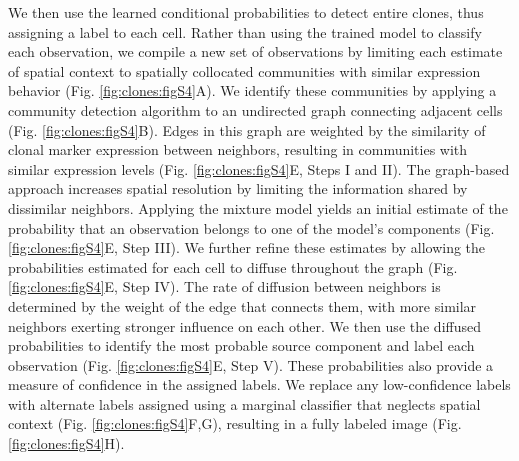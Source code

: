 We then use the learned conditional probabilities to detect entire clones, thus assigning a label to each cell. Rather than using the trained model to classify each observation, we compile a new set of observations by limiting each estimate of spatial context to spatially collocated communities with similar expression behavior (Fig. \ref{fig:clones:figS4}A). We identify these communities by applying a community detection algorithm to an undirected graph connecting adjacent cells (Fig. \ref{fig:clones:figS4}B). Edges in this graph are weighted by the similarity of clonal marker expression between neighbors, resulting in communities with similar expression levels (Fig. \ref{fig:clones:figS4}E, Steps I and II). The graph-based approach increases spatial resolution by limiting the information shared by dissimilar neighbors. Applying the mixture model yields an initial estimate of the probability that an observation belongs to one of the model's components (Fig. \ref{fig:clones:figS4}E, Step III). We further refine these estimates by allowing the probabilities estimated for each cell to diffuse throughout the graph (Fig. \ref{fig:clones:figS4}E, Step IV). The rate of diffusion between neighbors is determined by the weight of the edge that connects them, with more similar neighbors exerting stronger influence on each other. We then use the diffused probabilities to identify the most probable source component and label each observation (Fig. \ref{fig:clones:figS4}E, Step V). These probabilities also provide a measure of confidence in the assigned labels. We replace any low-confidence labels with alternate labels assigned using a marginal classifier that neglects spatial context (Fig. \ref{fig:clones:figS4}F,G), resulting in a fully labeled image (Fig. \ref{fig:clones:figS4}H).

